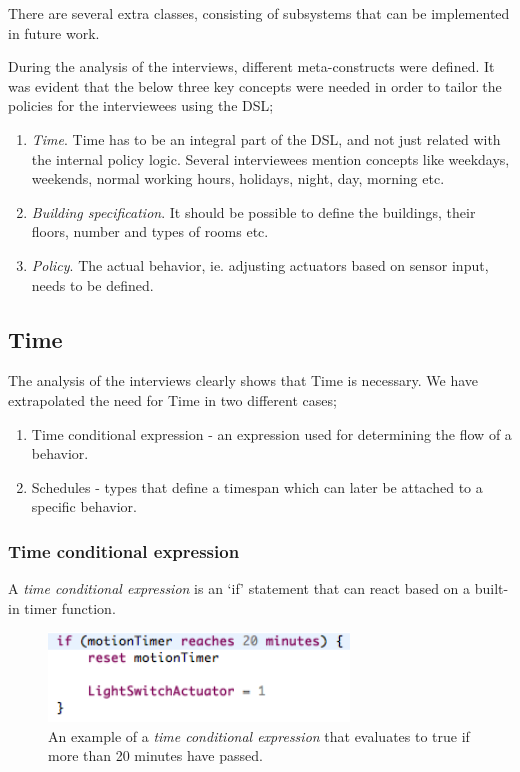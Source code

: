 \documentclass{llncs}
\begin{document}
\pagebreak
There are several extra classes, consisting of subsystems that can be implemented in future work.

During the analysis of the interviews, different meta-constructs were defined. It was evident that the below three key concepts were needed in order to tailor the policies for the interviewees using the DSL;

\begin{enumerate}
	\item \textit{Time}. Time has to be an integral part of the DSL, and not just related with the internal policy logic. Several interviewees mention concepts like weekdays, weekends, normal working hours, holidays, night, day, morning etc.
	
	\item \textit{Building specification}. It should be possible to define the buildings, their floors, number and types of rooms etc.

	\item \textit{Policy}. The actual behavior, ie. adjusting actuators based on sensor input, needs to be defined. 
\end{enumerate}

\subsection{Time}\label{subsec:time}
The analysis of the interviews clearly shows that Time is necessary. We have extrapolated the need for Time in two different cases;
	\begin{enumerate}
		\item Time conditional expression - an expression used for determining the flow of a behavior.
		\item Schedules - types that define a timespan which can later be attached to a specific behavior.
	\end{enumerate}

\subsubsection{Time conditional expression}\label{subsubsec:conditionalexpression}
A \textit{time conditional expression} is an `if' statement that can react based on a built-in timer function. 

\begin{figure}
  \centering
    \includegraphics[width=8cm]{dsl-conditional-time-expression.png} 
	\caption{An example of a \textit{time conditional expression} that evaluates to true if more than 20 minutes have passed.}
	\label{fig:dsl-conditionalexpression}
\end{figure}
\end{document}
